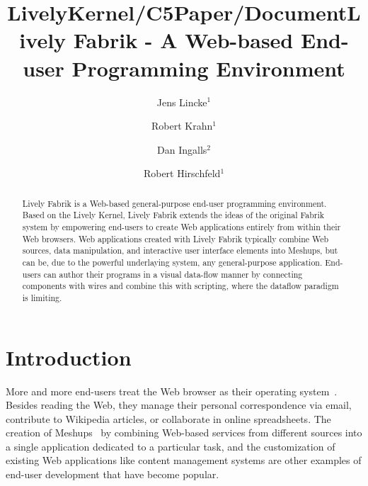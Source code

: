 \documentclass[pdftex, times, 10pt, twocolumn]{article}
\title{LivelyKernel/C5Paper/Document}
\author{ }
\date{ }
\begin{document}
\title{Lively Fabrik - A Web-based End-user Programming Environment}

\author{%
Jens Lincke$^1$  \\
\and
Robert Krahn$^1$\\
\and
Dan Ingalls$^2$\\
\and
Robert Hirschfeld$^1$\\
}


\maketitle
\thispagestyle{empty}


 

\begin{abstract} 

Lively Fabrik is a Web-based general-purpose end-user programming environment. Based on the Lively Kernel, Lively Fabrik extends the ideas of the original Fabrik system by empowering end-users to create Web applications entirely from within their Web browsers. Web applications created with Lively Fabrik typically combine Web sources, data manipulation, and interactive user interface elements into Meshups, but can be, due to the powerful underlaying system, any general-purpose application. End-users can author their programs in a visual data-flow manner by connecting components with wires and combine this with scripting, where the dataflow paradigm is limiting. 

\end{abstract} 



\section{Introduction}
More and more end-users treat the Web browser as their operating system~\cite{Taivalsaari2008TLKE}. Besides reading the Web, they manage their personal correspondence via email, contribute to Wikipedia articles, or collaborate in online spreadsheets. The creation of Meshups~\cite{Merrill2006MNB} by combining Web-based services from different sources into a single application dedicated to a particular task, and the customization of existing Web applications like content management systems are other examples of end-user development that have become popular.  
\end{document}
